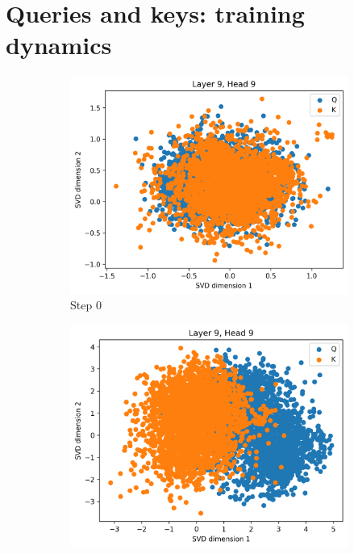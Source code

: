 \section{Queries and keys: training dynamics}
\label{sec:qk}
\begin{figure}[ht]
    \centering
    \begin{subfigure}[b]{0.43\linewidth}
         \includegraphics[width=\linewidth]{sources/part_1/anisotropy/imgs/dist_l9h9_s0.png}
         \caption{Step 0}
         \label{fig:dist_qk_s0}
    \end{subfigure}
    \begin{subfigure}[b]{0.43\linewidth}
         \includegraphics[width=\linewidth]{sources/part_1/anisotropy/imgs/dist_l9h9_s40.png}

\end{subfigure}
\end{figure}
